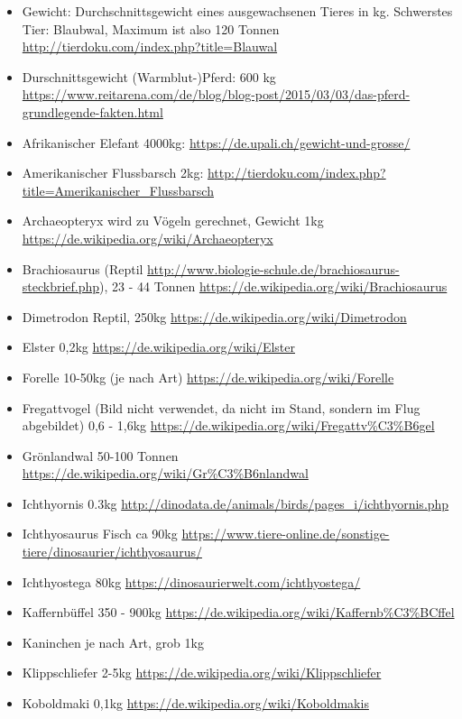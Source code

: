  \begin{itemize}
  \item Gewicht: Durchschnittsgewicht eines ausgewachsenen Tieres in kg. Schwerstes Tier: Blaubwal, Maximum ist also 120 Tonnen \url{http://tierdoku.com/index.php?title=Blauwal}
  \item Durschnittsgewicht (Warmblut-)Pferd: 600 kg \url{https://www.reitarena.com/de/blog/blog-post/2015/03/03/das-pferd-grundlegende-fakten.html}
  \item Afrikanischer Elefant 4000kg: \url{https://de.upali.ch/gewicht-und-grosse/}
  \item Amerikanischer Flussbarsch 2kg: \url{http://tierdoku.com/index.php?title=Amerikanischer_Flussbarsch}
  \item Archaeopteryx wird zu Vögeln gerechnet, Gewicht 1kg \url{https://de.wikipedia.org/wiki/Archaeopteryx}
  \item Brachiosaurus (Reptil \url{http://www.biologie-schule.de/brachiosaurus-steckbrief.php}), 23 - 44 Tonnen \url{https://de.wikipedia.org/wiki/Brachiosaurus}
  \item Dimetrodon Reptil, 250kg \url{https://de.wikipedia.org/wiki/Dimetrodon}
  \item Elster 0,2kg \url{https://de.wikipedia.org/wiki/Elster}
  \item Forelle 10-50kg (je nach Art) \url{https://de.wikipedia.org/wiki/Forelle}
  \item Fregattvogel (Bild nicht verwendet, da nicht im Stand, sondern im Flug abgebildet) 0,6 - 1,6kg \url{https://de.wikipedia.org/wiki/Fregattv\%C3\%B6gel}
  \item Grönlandwal 50-100 Tonnen \url{https://de.wikipedia.org/wiki/Gr\%C3\%B6nlandwal}
  \item Ichthyornis 0.3kg \url{http://dinodata.de/animals/birds/pages_i/ichthyornis.php}
  \item Ichthyosaurus Fisch ca 90kg \url{https://www.tiere-online.de/sonstige-tiere/dinosaurier/ichthyosaurus/}
  \item Ichthyostega 80kg \url{https://dinosaurierwelt.com/ichthyostega/}
  \item Kaffernbüffel 350 - 900kg \url{https://de.wikipedia.org/wiki/Kaffernb\%C3\%BCffel}
  \item Kaninchen je nach Art, grob 1kg
  \item Klippschliefer 2-5kg \url{https://de.wikipedia.org/wiki/Klippschliefer}
  \item Koboldmaki 0,1kg \url{https://de.wikipedia.org/wiki/Koboldmakis}

\end{itemize}

